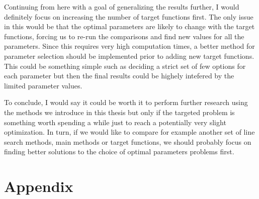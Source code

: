 \documentclass[a4paper,english,titlepage,12pt]{article}
\begin{document}
Continuing from here with a goal of generalizing the results further, I would definitely focus on increasing the number of target functions first. The only issue in this would be that the optimal parameters are likely to change with the target functions, forcing us to re-run the comparisons and find new values for all the parameters. Since this requires very high computation times, a better method for parameter selection should be implemented prior to adding new target functions. This could be something simple such as deciding a strict set of few options for each parameter but then the final results could be highely intefered by the limited parameter values.

To conclude, I would say it could be worth it to perform further research using the methods we introduce in this thesis but only if the targeted problem is something worth spending a while just to reach a potentially very slight optimization. In turn, if we would like to compare for example another set of line search methods, main methods or target functions, we should probably focus on finding better solutions to the choice of optimal parameters problems first.

\newpage
% 






\newpage
\appendix
\section{Appendix}
% 
\end{document}
